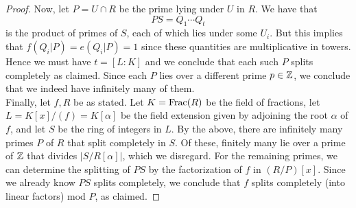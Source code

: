 \begin{proof}
	Now, let $P = U \cap R$ be the prime lying under $U$ in $R$. We have that
	\[ PS = Q_1 \cdots Q_t \]
	is the product of primes of $S$, each of which lies under some $U_i$. But this implies that $f(Q_i|P) = e(Q_i|P) = 1$ since these quantities are multiplicative in towers. Hence we must have $t = [L:K]$ and we conclude that each such $P$ splits completely as claimed. Since each $P$ lies over a different prime $p \in \mathbb{Z}$, we conclude that we indeed have infinitely many of them. \\
	
	Finally, let $f,R$ be as stated. Let $K = \operatorname{Frac}(R)$ be the field of fractions, let $L = K[x]/(f) = K[\alpha]$ be the field extension given by adjoining the root $\alpha$ of $f$, and let $S$ be the ring of integers in $L$. By the above, there are infinitely many primes $P$ of $R$ that split completely in $S$. Of these, finitely many lie over a prime of $\mathbb{Z}$ that divides $|S/R[\alpha]|$, which we disregard. For the remaining primes, we can determine the splitting of $PS$ by the factorization of $f$ in $(R/P)[x]$. Since we already know $PS$ splits completely, we conclude that $f$ splits completely (into linear factors) mod $P$, as claimed.
\end{proof}
